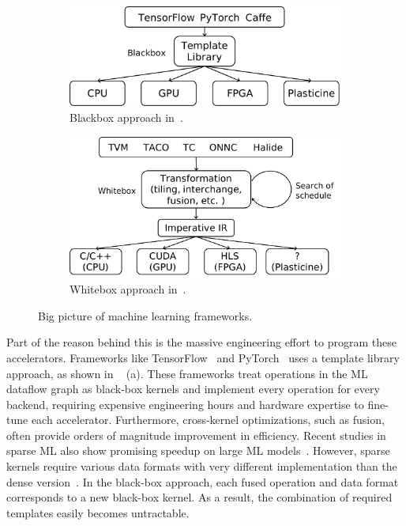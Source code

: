 \begin{figure}
\centering
\begin{subfigure}[b]{0.48\textwidth}
\centering
\includegraphics[width=1\textwidth]{figs/blackbox.pdf}
\caption{
  Blackbox approach in~\cite{tensorflow,pytorch,caffe}.
}
\end{subfigure}
\hfill
\begin{subfigure}[b]{0.48\textwidth}
\centering
\includegraphics[width=1\textwidth]{figs/whitebox.pdf}
\caption{
  Whitebox approach in~\cite{tvm,taco,tc,onnc,halide}.
}
\end{subfigure}
\caption[Big picture of machine learning frameworks]{
  Big picture of machine learning frameworks.
}
\label{fig:bigpic}
\end{figure}

Part of the reason behind this is the massive engineering effort to program these accelerators.
Frameworks like TensorFlow~\cite{tensorflow} and PyTorch~\cite{caffe} uses a template library
approach, as shown in ~ (a).
These frameworks treat operations in the ML dataflow graph as black-box kernels and implement
every operation for every backend, requiring expensive engineering hours and hardware expertise to
fine-tune each accelerator.
Furthermore, cross-kernel optimizations, such as fusion, often provide orders of magnitude improvement in efficiency.
Recent studies in sparse ML also show promising speedup on large ML models~\cite{eie}.
However, sparse kernels require various data formats with very different implementation than the dense
version~\cite{tacosparse}.
In the black-box approach, each fused operation and data format corresponds to a new black-box
kernel.
As a result, the combination of required templates easily becomes untractable.


